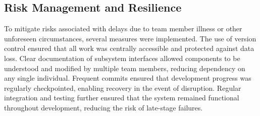 \documentclass[a4paper,11pt]{report}
\begin{document}
\subsection{Risk Management and Resilience}
To mitigate risks associated with delays due to team member illness or other unforeseen circumstances, several measures were implemented. The use of version control ensured that all work was centrally accessible and protected against data loss.
Clear documentation of subsystem interfaces allowed components to be understood and modified by multiple team members, reducing dependency on any single individual.
Frequent commits ensured that development progress was regularly checkpointed, enabling recovery in the event of disruption. Regular integration and testing further ensured that the system remained functional throughout development, reducing the risk of late-stage failures.
\end{document}
